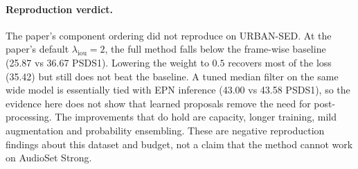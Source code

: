 \paragraph{Reproduction verdict.}
The paper's component ordering did not reproduce on URBAN-SED. At the paper's
default $\lambda_{\mathrm{iou}}=2$, the full method falls below the frame-wise
baseline (25.87 vs 36.67 PSDS1). Lowering the weight to $0.5$ recovers most of
the loss (35.42) but still does not beat the baseline. A tuned median filter on
the same wide model is essentially tied with EPN inference (43.00 vs 43.58
PSDS1), so the evidence here does not show that learned proposals remove the
need for post-processing. The improvements that do hold are capacity, longer
training, mild augmentation and probability ensembling. These are negative
reproduction findings about this dataset and budget, not a claim that the method
cannot work on AudioSet Strong.
